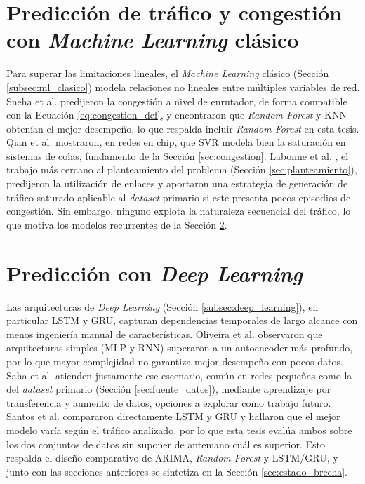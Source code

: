 \documentclass[12pt]{report}
\begin{document}
\section{Predicción de tráfico y congestión con \textit{Machine Learning} clásico}
\label{sec:estado_ml}

Para superar las limitaciones lineales, el \textit{Machine Learning} clásico (Sección \ref{subsec:ml_clasico}) modela relaciones no lineales entre múltiples variables de red. Sneha et al. \cite{sneha2020} predijeron la congestión a nivel de enrutador, de forma compatible con la Ecuación \ref{eq:congestion_def}, y encontraron que \textit{Random Forest} y KNN obtenían el mejor desempeño, lo que respalda incluir \textit{Random Forest} en esta tesis. Qian et al. \cite{qian2016} mostraron, en redes en chip, que SVR modela bien la saturación en sistemas de colas, fundamento de la Sección \ref{sec:congestion}. Labonne et al. \cite{labonne2021}, el trabajo más cercano al planteamiento del problema (Sección \ref{sec:planteamiento}), predijeron la utilización de enlaces y aportaron una estrategia de generación de tráfico saturado aplicable al \textit{dataset} primario si este presenta pocos episodios de congestión. Sin embargo, ninguno explota la naturaleza secuencial del tráfico, lo que motiva los modelos recurrentes de la Sección \ref{sec:estado_dl}.

\section{Predicción con \textit{Deep Learning}}
\label{sec:estado_dl}

Las arquitecturas de \textit{Deep Learning} (Sección \ref{subsec:deep_learning}), en particular LSTM y GRU, capturan dependencias temporales de largo alcance con menos ingeniería manual de características. Oliveira et al. \cite{oliveira2016} observaron que arquitecturas simples (MLP y RNN) superaron a un autoencoder más profundo, por lo que mayor complejidad no garantiza mejor desempeño con pocos datos. Saha et al. \cite{saha2024} atienden justamente ese escenario, común en redes pequeñas como la del \textit{dataset} primario (Sección \ref{sec:fuente_datos}), mediante aprendizaje por transferencia y aumento de datos, opciones a explorar como trabajo futuro. Santos et al. \cite{santos2022} compararon directamente LSTM y GRU y hallaron que el mejor modelo varía según el tráfico analizado, por lo que esta tesis evalúa ambos sobre los dos conjuntos de datos sin suponer de antemano cuál es superior. Esto respalda el diseño comparativo de ARIMA, \textit{Random Forest} y LSTM/GRU, y junto con las secciones anteriores se sintetiza en la Sección \ref{sec:estado_brecha}.
\end{document}

